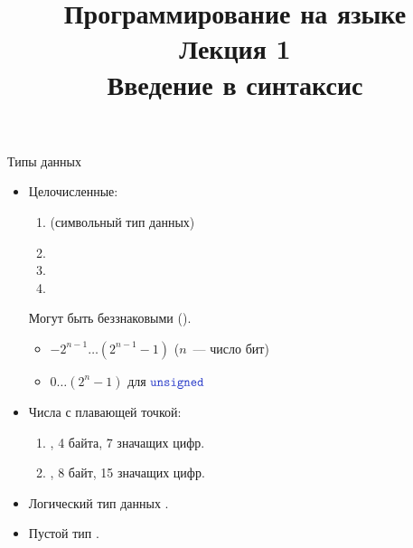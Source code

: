 \documentclass{beamer}
\title{{\bf Программирование на языке \langcpp\protect\\Лекция
1\protect\vspace{1em}\\}Введение в синтаксис \langcpp}
\begin{document}
\begin{frame} 
  \titlepage
\end{frame}

\begin{frame}[fragile]{Типы данных}
\begin{itemize}
    \item Целочисленные:
        \begin{enumerate}
            \item {} (символьный тип данных)
            \item {}
            \item {}
            \item {}
        \end{enumerate}
    Могут быть беззнаковыми ().
    \begin{itemize}
        \item $-2^{n-1}\ldots (2^{n-1} - 1)$ ($n$~--- число бит)
        \item $0\ldots (2^{n} - 1)$ для $\code{unsigned}$
    \end{itemize}

    \item Числа с плавающей точкой:
        \begin{enumerate}
            \item {}, 4 байта, 7 значащих цифр.
            \item {}, 8 байт, 15 значащих цифр.
        \end{enumerate}
    \item Логический тип данных .
        
    \item Пустой тип .
\end{itemize}
\end{frame}
\end{document}
